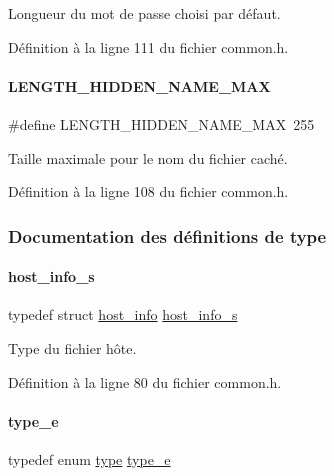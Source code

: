 Longueur du mot de passe choisi par défaut. 

Définition à la ligne 111 du fichier common.\+h.

\mbox{\label{a00047_a7abae389b15b6d71177b6ec6155aad8f}} 
\paragraph{\texorpdfstring{L\+E\+N\+G\+T\+H\+\_\+\+H\+I\+D\+D\+E\+N\+\_\+\+N\+A\+M\+E\+\_\+\+M\+AX}{LENGTH\_HIDDEN\_NAME\_MAX}}
{\footnotesize\ttfamily \#define L\+E\+N\+G\+T\+H\+\_\+\+H\+I\+D\+D\+E\+N\+\_\+\+N\+A\+M\+E\+\_\+\+M\+AX~255}

Taille maximale pour le nom du fichier caché. 

Définition à la ligne 108 du fichier common.\+h.



\subsubsection{Documentation des définitions de type}
\mbox{\label{a00047_a47a6ba857e6823e361bd050dfdf415a2}} 
\paragraph{\texorpdfstring{host\+\_\+info\+\_\+s}{host\_info\_s}}
{\footnotesize\ttfamily typedef struct \hyperlink{a00146}{host\+\_\+info} \hyperlink{a00047_a47a6ba857e6823e361bd050dfdf415a2}{host\+\_\+info\+\_\+s}}

Type du fichier hôte. 

Définition à la ligne 80 du fichier common.\+h.

\mbox{\label{a00047_af1ca434cca36ba9fb2a45f6cef3a16d6}} 
\paragraph{\texorpdfstring{type\+\_\+e}{type\_e}}
{\footnotesize\ttfamily typedef enum \hyperlink{a00047_a7aead736a07eaf25623ad7bfa1f0ee2d}{type} \hyperlink{a00047_af1ca434cca36ba9fb2a45f6cef3a16d6}{type\+\_\+e}}

